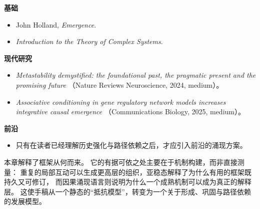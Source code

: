 \begin{readingbox}
\textbf{基础}
\begin{itemize}[nosep]
  \item John Holland, \emph{Emergence}.
  \item \emph{Introduction to the Theory of Complex Systems}.
\end{itemize}
\textbf{现代研究}
\begin{itemize}[nosep]
  \item \emph{Metastability demystified: the foundational past, the pragmatic
        present and the promising future} （Nature Reviews Neuroscience, 2024,
        medium）。
  \item \emph{Associative conditioning in gene regulatory network models
        increases integrative causal emergence} （Communications Biology, 2025,
        medium）。
\end{itemize}
\textbf{前沿}
\begin{itemize}[nosep]
  \item 只有在读者已经理解历史强化与路径依赖之后，才应引入前沿的涌现方案。
\end{itemize}
\end{readingbox}

\begin{summarybox}
本章解释了框架从何而来。
它的有据可依之处主要在于机制构建，而非直接测量：
重复的局部互动可以生成更高层的组织，亚稳态解释了为什么有用的框架既持久又可修订，
而因果涌现语言则说明为什么一个成熟机制可以成为真正的解释层。
这使手稿从一个静态的“抵抗模型”，转变为一个关于形成、巩固与路径依赖的发展模型。
\end{summarybox}